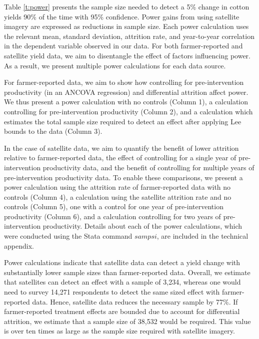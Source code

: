 \documentclass{article}
\begin{document}
Table \ref{t:power} presents the sample size needed to detect a 5\% change in cotton yields 90\% of the time with 95\% confidence. Power gains from using satellite imagery are expressed as reductions in sample size. Each power calculation uses the relevant mean, standard deviation, attrition rate, and year-to-year correlation in the dependent variable observed in our data. For both farmer-reported and satellite yield data, we aim to disentangle the effect of factors influencing power. As a result, we present multiple power calculations for each data source. 

For farmer-reported data, we aim to show how controlling for pre-intervention productivity (in an ANCOVA regression) and differential attrition affect power. We thus present a power calculation with no controls (Column 1), a calculation controlling for pre-intervention productivity (Column 2), and a calculation which estimates the total sample size required to detect an effect after applying Lee bounds to the data (Column 3). 

In the case of satellite data, we aim to quantify the benefit of lower attrition relative to farmer-reported data, the effect of controlling for a single year of pre-intervention productivity data, and the benefit of controlling for multiple years of pre-intervention productivity data. To enable these comparisons, we present a power calculation using the attrition rate of farmer-reported data with no controls (Column 4), a calculation using the satellite attrition rate and no controls (Column 5), one with a control for one year of pre-intervention productivity (Column 6), and a calculation controlling for two years of pre-intervention productivity. Details about each of the power calculations, which were conducted using the Stata command $sampsi$, are included in the technical appendix. 

Power calculations indicate that satellite data can detect a yield change with substantially lower sample sizes than farmer-reported data. Overall, we estimate that satellites can detect an effect with a sample of 3,234, whereas one would need to survey 14,271 respondents to detect the same sized effect with farmer-reported data. Hence, satellite data reduces the necessary sample by 77\%. If farmer-reported treatment effects are bounded due to account for differential attrition, we estimate that a sample size of 38,532 would be required. This value is over ten times as large as the sample size required with satellite imagery. 
\end{document}
